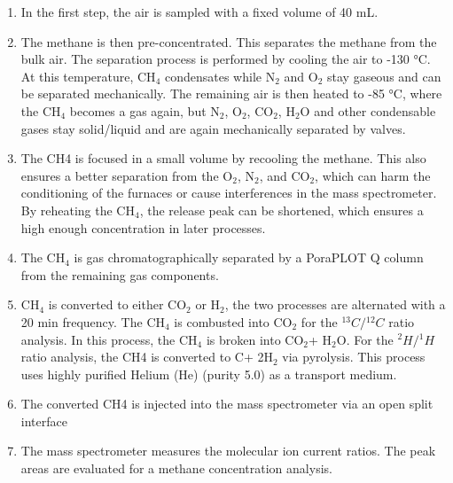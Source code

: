 \begin{enumerate}
  \item In the first step, the air is sampled with a fixed volume of 40 mL.
  \item The methane is then pre-concentrated. This separates the methane from the bulk air. The separation process is performed by cooling the air to -130 °C. At this temperature, CH$_4$ condensates while N$_2$ and O$_2$ stay gaseous and can be separated mechanically. The remaining air is then heated to -85 °C, where the CH$_4$ becomes a gas again, but N$_2$, O$_2$, CO$_2$, H$_2$O and other condensable gases stay solid/liquid and are again mechanically separated by valves.
  \item The CH4 is focused in a small volume by recooling the methane. This also ensures a better separation from the O$_2$, N$_2$, and CO$_2$, which can harm the conditioning of the furnaces or cause interferences in the mass spectrometer. By reheating the CH$_4$, the release peak can be shortened, which ensures a high enough concentration in later processes. 
  \item The CH$_4$ is gas chromatographically separated by a PoraPLOT Q column from the remaining gas components.
  \item CH$_4$ is converted to either CO$_2$ or H$_2$, the two processes are alternated with a 20 min frequency. The CH$_4$ is combusted into CO$_2$ for the ${^{13}C}/{^{12}C}$ ratio analysis. In this process, the CH$_4$ is broken into CO$_2$+ H$_2$O. For the ${^{2}H}/{^{1}H}$ ratio analysis, the CH4 is converted to C+ 2H$_2$ via pyrolysis. This process uses highly purified Helium (He) (purity 5.0) as a transport medium.
  \item The converted CH4 is injected into the mass spectrometer via an open split interface 
  \item The mass spectrometer measures the molecular ion current ratios. The peak areas are evaluated for a methane concentration analysis.
\end{enumerate}
